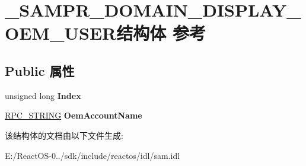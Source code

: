 \hypertarget{struct___s_a_m_p_r___d_o_m_a_i_n___d_i_s_p_l_a_y___o_e_m___u_s_e_r}{}\section{\+\_\+\+S\+A\+M\+P\+R\+\_\+\+D\+O\+M\+A\+I\+N\+\_\+\+D\+I\+S\+P\+L\+A\+Y\+\_\+\+O\+E\+M\+\_\+\+U\+S\+E\+R结构体 参考}
\label{struct___s_a_m_p_r___d_o_m_a_i_n___d_i_s_p_l_a_y___o_e_m___u_s_e_r}
\subsection*{Public 属性}
\begin{DoxyCompactItemize}
\item 
\mbox{\label{struct___s_a_m_p_r___d_o_m_a_i_n___d_i_s_p_l_a_y___o_e_m___u_s_e_r_a8ac5ea7d0be716d393e68492a839e88e}} 
unsigned long {\bfseries Index}
\item 
\mbox{\label{struct___s_a_m_p_r___d_o_m_a_i_n___d_i_s_p_l_a_y___o_e_m___u_s_e_r_aef5b6e8e1404a582c17e64f4bde96728}} 
\hyperlink{struct___r_p_c___s_t_r_i_n_g}{R\+P\+C\+\_\+\+S\+T\+R\+I\+NG} {\bfseries Oem\+Account\+Name}
\end{DoxyCompactItemize}


该结构体的文档由以下文件生成\+:\begin{DoxyCompactItemize}
\item 
E\+:/\+React\+O\+S-\/0../sdk/include/reactos/idl/sam.\+idl\end{DoxyCompactItemize}

